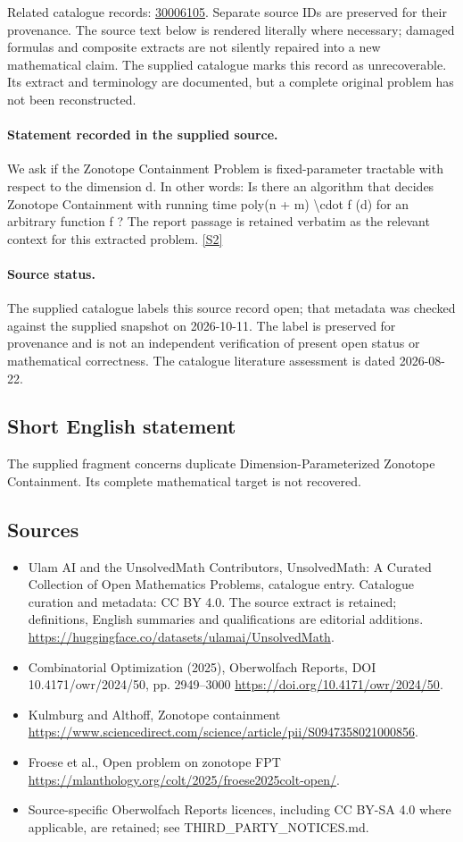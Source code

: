 \documentclass[11pt]{article}
\begin{document}
Related catalogue records: \href{https://mehmetmars7.github.io/Erdosproblems-llm-hunter/problem.html?type=open_problems&id=30006105}{30006105}. Separate source IDs are preserved for their provenance.
The source text below is rendered literally where necessary; damaged formulas and composite extracts are not silently repaired into a new mathematical claim.
The supplied catalogue marks this record as unrecoverable. Its extract and terminology are documented, but a complete original problem has not been reconstructed.
\paragraph{Statement recorded in the supplied source.}
We ask if the Zonotope Containment Problem is fixed-parameter tractable with respect to the dimension d. In other words: Is there an algorithm that decides Zonotope Containment with running time poly(n + m) \textbackslash{}cdot f (d) for an arbitrary function f ? The report passage is retained verbatim as the relevant context for this extracted problem. \href{https://doi.org/10.4171/owr/2024/50}{[S2]}
\paragraph{Source status.}
The supplied catalogue labels this source record open; that metadata was checked against the supplied snapshot on 2026-10-11. The label is preserved for provenance and is not an independent verification of present open status or mathematical correctness. The catalogue literature assessment is dated 2026-08-22.
\subsection{Short English statement}
The supplied fragment concerns duplicate Dimension-Parameterized Zonotope Containment. Its complete mathematical target is not recovered.
\subsection{Sources}
\begin{itemize}
\item[S1] Ulam AI and the UnsolvedMath Contributors, UnsolvedMath: A Curated Collection of Open Mathematics Problems, catalogue entry. Catalogue curation and metadata: CC BY 4.0. The source extract is retained; definitions, English summaries and qualifications are editorial additions.
\url{https://huggingface.co/datasets/ulamai/UnsolvedMath}.
\item[S2] Combinatorial Optimization (2025), Oberwolfach Reports, DOI 10.4171/owr/2024/50, pp. 2949--3000
\url{https://doi.org/10.4171/owr/2024/50}.
\item[S3] Kulmburg and Althoff, Zonotope containment
\url{https://www.sciencedirect.com/science/article/pii/S0947358021000856}.
\item[S4] Froese et al., Open problem on zonotope FPT
\url{https://mlanthology.org/colt/2025/froese2025colt-open/}.
\item Source-specific Oberwolfach Reports licences, including CC BY-SA 4.0 where applicable, are retained; see THIRD\_PARTY\_NOTICES.md.
\end{itemize}
\end{document}

